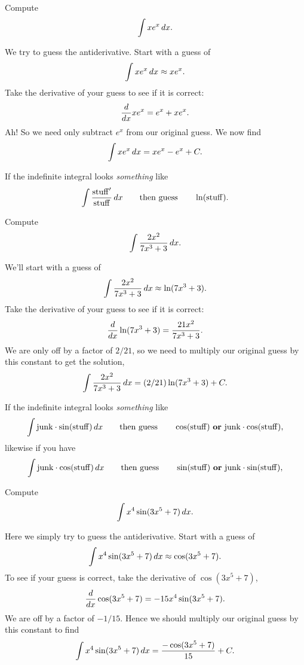 \documentclass{ximera}
\begin{document}
\begin{example}
Compute
\[
\int xe^{x} \,d x.
\]


We try to guess the antiderivative. Start with a guess of
\[
\int xe^x \,d x \approx xe^x.
\]
Take the derivative of your guess to see if it is correct:
\[
\frac{d}{dx} xe^x = e^x + xe^x.
\]
Ah! So we need only subtract $e^x$ from our original guess.  We now
find
\[
\int xe^x \,d x =xe^x - e^x + C.
\]
\end{example}





\begin{template}\label{template:lnchain}
If the indefinite integral looks \emph{something} like
\[
\int \frac{\mathrm{stuff}'}{\mathrm{stuff}}\,d x \qquad\text{then guess}\qquad\ln(\mathrm{stuff}).
\]
\end{template}

\begin{example}
Compute
\[
\int \frac{2x^2}{7x^3 + 3} \,d x.
\]


We'll start with a guess of
\[
\int \frac{2x^2}{7x^3 + 3} \,d x \approx \ln(7x^3+3).
\]
Take the derivative of your guess to see if it is correct:
\[
\frac{d}{dx} \ln(7x^3+3) = \frac{21x^2}{7x^3 + 3}.
\]
We are only off by a factor of $2/21$, so we need to multiply our
original guess by this constant to get the solution,
\[
\int \frac{2x^2}{7x^3 + 3} \,d x = (2/21)\ln(7x^3+3)+C.
\]
\end{example}




\begin{template}\label{template:trigchain}
If the indefinite integral looks \emph{something} like
\[
\int \mathrm{junk}\cdot \sin(\mathrm{stuff}) \,d x \qquad\text{then
  guess}\qquad \cos(\mathrm{stuff}) \text{ \textbf{or} }\mathrm{junk}
\cdot \cos(\mathrm{stuff}),
\]
likewise if you have 
\[
\int \mathrm{junk}\cdot \cos(\mathrm{stuff}) \,d x \qquad\text{then
  guess}\qquad \sin(\mathrm{stuff}) \text{ \textbf{or} }\mathrm{junk}
\cdot \sin(\mathrm{stuff}),
\]
\end{template}



\begin{example}
Compute
\[
\int x^4\sin(3x^5+7) \,d x.
\]



Here we simply try to guess the antiderivative. Start with a guess of
\[
\int x^4\sin(3x^5+7)\,d x \approx \cos(3x^5+7).
\]
To see if your guess is correct, take the derivative of $\cos(3x^5+7)$,
\[
\frac{d}{dx} \cos(3x^5+7) = -15x^4\sin(3x^5+7).
\]
We are off by a factor of $-1/15$. Hence we should multiply our
original guess by this constant to find
\[
\int x^4\sin(3x^5+7) \,d x = \frac{-\cos(3x^5+7)}{15} + C.
\]
\end{example}
\end{document}
